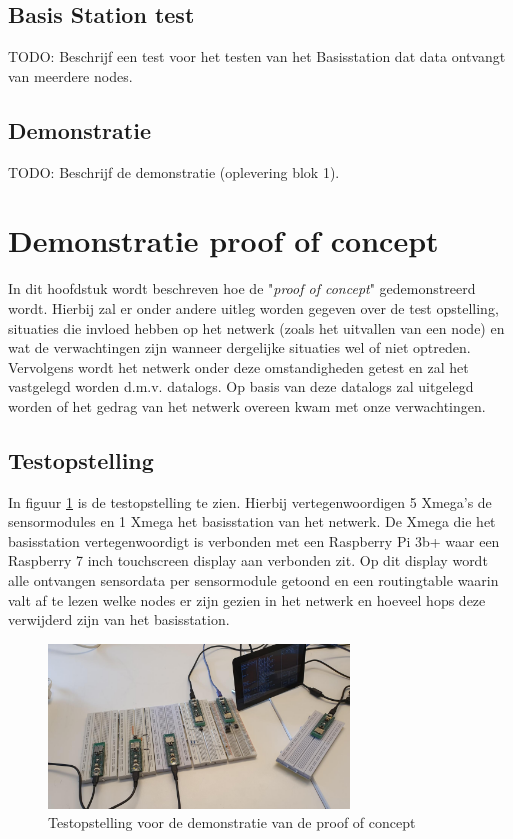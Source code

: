\documentclass[a4paper, 11pt]{article}
\begin{document}
\subsection{Basis Station test}
TODO: Beschrijf een test voor het testen van het Basisstation dat data ontvangt van meerdere nodes.
\subsection{Demonstratie}
TODO: Beschrijf de demonstratie (oplevering blok 1).

\section{Demonstratie proof of concept} \label{demonstratie}
In dit hoofdstuk wordt beschreven hoe de "\textit{proof of concept}" gedemonstreerd wordt. Hierbij zal er onder andere uitleg worden gegeven over de test opstelling, situaties die invloed hebben op het netwerk (zoals het uitvallen van een node) en wat de verwachtingen zijn wanneer dergelijke situaties wel of niet optreden. Vervolgens wordt het netwerk onder deze omstandigheden getest en zal het vastgelegd worden d.m.v. datalogs. Op basis van deze datalogs zal uitgelegd worden of het gedrag van het netwerk overeen kwam met onze verwachtingen.
\newpage
\subsection{Testopstelling} \label{Testopstelling}
In figuur \ref{testopstelling} is de testopstelling te zien. Hierbij vertegenwoordigen 5 Xmega's de sensormodules en 1 Xmega het basisstation van het netwerk. De Xmega die het basisstation vertegenwoordigt is verbonden met een Raspberry Pi 3b+  waar een Raspberry 7 inch touchscreen display aan verbonden zit. Op dit display wordt alle ontvangen sensordata per sensormodule getoond en een routingtable waarin valt af te lezen welke nodes er zijn gezien in het netwerk en hoeveel hops deze verwijderd zijn van het basisstation.
\begin{figure}[h!]
	\centering
	\includegraphics[width=8cm]{media/TestOpstellingNetwerk.jpeg}
	\caption{Testopstelling voor de demonstratie van de proof of concept} \label{testopstelling}
\end{figure}
\end{document}
